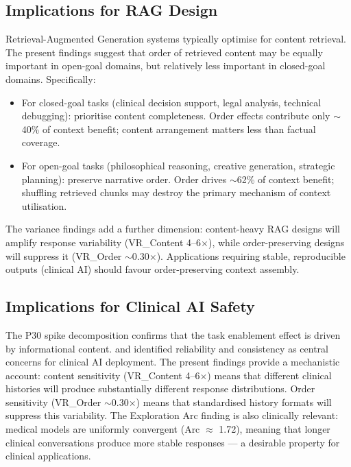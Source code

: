 \documentclass[11pt,a4paper]{article}
\begin{document}
\subsection{Implications for RAG Design}

Retrieval-Augmented Generation systems \citep{lewis2020retrieval} typically optimise for content retrieval. The present findings suggest that order of retrieved content may be equally important in open-goal domains, but relatively less important in closed-goal domains. Specifically:

\begin{itemize}
    \item For closed-goal tasks (clinical decision support, legal analysis, technical debugging): prioritise content completeness. Order effects contribute only $\sim$40\% of context benefit; content arrangement matters less than factual coverage.
    \item For open-goal tasks (philosophical reasoning, creative generation, strategic planning): preserve narrative order. Order drives $\sim$62\% of context benefit; shuffling retrieved chunks may destroy the primary mechanism of context utilisation.
\end{itemize}

The variance findings add a further dimension: content-heavy RAG designs will amplify response variability (VR\_Content 4--6$\times$), while order-preserving designs will suppress it (VR\_Order $\sim$0.30$\times$). Applications requiring stable, reproducible outputs (clinical AI) should favour order-preserving context assembly.

\subsection{Implications for Clinical AI Safety}

The P30 spike decomposition confirms that the task enablement effect \citep{laxman2026paper3} is driven by informational content. \citet{wornow2023shaky} and \citet{asgari2025framework} identified reliability and consistency as central concerns for clinical AI deployment. The present findings provide a mechanistic account: content sensitivity (VR\_Content 4--6$\times$) means that different clinical histories will produce substantially different response distributions. Order sensitivity (VR\_Order $\sim$0.30$\times$) means that standardised history formats will suppress this variability. The Exploration Arc finding is also clinically relevant: medical models are uniformly convergent (Arc $\approx$ 1.72), meaning that longer clinical conversations produce more stable responses --- a desirable property for clinical applications.
\end{document}
